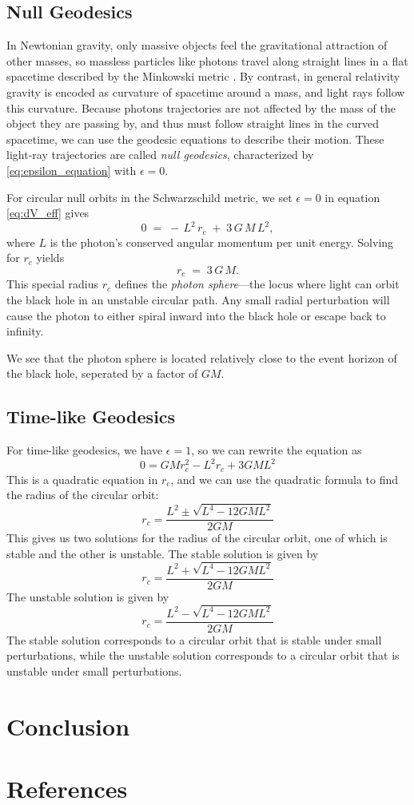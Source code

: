 \documentclass[12pt]{article}
\begin{document}
\subsection{Null Geodesics}

In Newtonian gravity, only massive objects feel the gravitational attraction of other masses, so massless particles like photons travel along straight lines in a flat spacetime described by the Minkowski metric \cite{carrol2019spacetime}.  
By contrast, in general relativity gravity is encoded as curvature of spacetime around a mass, and light rays follow this curvature.  
Because photons trajectories are not affected by the mass of the object they are passing by, and thus must follow straight lines in the curved spacetime, we can use the geodesic equations to describe their motion.
These light‐ray trajectories are called \emph{null geodesics}, characterized by \ref{eq:epsilon_equation} with \(\epsilon = 0\).

For circular null orbits in the Schwarzschild metric, we set \(\epsilon=0\) in equation \ref{eq:dV_eff} gives
\[
0 \;=\; -\,L^{2}\,r_{c} \;+\; 3\,G\,M\,L^{2},
\]
where \(L\) is the photon’s conserved angular momentum per unit energy.  
Solving for \(r_{c}\) yields
\[
r_{c} \;=\; 3\,G\,M.
\]
This special radius \(r_{c}\) defines the \emph{photon sphere}—the locus where light can orbit the black hole in an unstable circular path. 
Any small radial perturbation will cause the photon to either spiral inward into the black hole or escape back to infinity.

We see that the photon sphere is located relatively close to the event horizon of the black hole, seperated by a factor of \(GM\).


\subsection{Time-like Geodesics}
For time-like geodesics, we have \(\epsilon = 1\), so we can rewrite the equation as
\[
	0 = GM r_{c}^{2} - L^{2} r_{c} + 3GM L^{2}
\]
This is a quadratic equation in \(r_{c}\), and we can use the quadratic formula to find the radius of the circular orbit:
\[
	r_{c} = \frac{L^{2} \pm \sqrt{L^{4} - 12GM L^{2}}}{2GM}
\]
This gives us two solutions for the radius of the circular orbit, one of which is stable and the other is unstable.
The stable solution is given by
\[
	r_{c} = \frac{L^{2} + \sqrt{L^{4} - 12GM L^{2}}}{2GM}
\]
The unstable solution is given by
\[
	r_{c} = \frac{L^{2} - \sqrt{L^{4} - 12GM L^{2}}}{2GM}
\]
The stable solution corresponds to a circular orbit that is stable under small perturbations, while the unstable solution corresponds to a circular orbit that is unstable under small perturbations.
\endgroup

\section{Conclusion}

\section{References}

\nocite{*}


\end{document}
